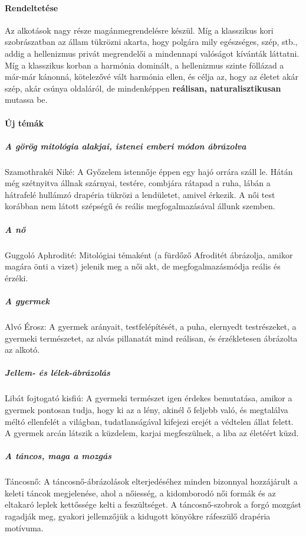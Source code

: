 \paragraph{Rendeltetése}
Az alkotások nagy része magánmegrendelésre készül. Míg a klasszikus kori szobrászatban az állam tükrözni akarta, hogy polgára mily egészséges, szép, stb., addig a hellenizmus privát megrendelői a mindennapi valóságot kívánták láttatni. Míg a klasszikus korban a harmónia dominált, a hellenizmus szinte föllázad a már-már kánonná, kötelezővé vált harmónia ellen, és célja az, hogy az életet akár szép, akár csúnya oldaláról, de mindenképpen \textbf{reálisan, naturalisztikusan} mutassa be.

\paragraph{Új témák}

	\subparagraph{A görög mitológia alakjai, istenei emberi módon ábrázolva}
	
	Szamothrakéi Niké: A Győzelem istennője éppen egy hajó orrára száll le. Hátán még szétnyitva állnak szárnyai, testére, combjára rátapad a ruha, lábán a hátrafelé hullámzó drapéria tükrözi a lendületet, amivel érkezik. A női test korábban nem látott szépségű és reális megfogalmazásával állunk szemben.
	
	\subparagraph{A nő}
	
	 Guggoló Aphrodité: Mitológiai témaként (a fürdőző Afroditét ábrázolja, amikor magára önti a vizet) jelenik meg a női akt, de megfogalmazásmódja reális és érzéki.
	
	\subparagraph{A gyermek}
	
	Alvó Érosz: A gyermek arányait, testfelépítését, a puha, elernyedt testrészeket, a gyermeki természetet, az alvás pillanatát mind reálisan, és érzékletesen ábrázolta az alkotó.
	
\clearpage	
	
	\subparagraph{Jellem- és lélek-ábrázolás}
	
	Libát fojtogató kisfiú: A gyermeki természet igen érdekes bemutatása, amikor a gyermek pontosan tudja, hogy ki az a lény, akinél ő feljebb való, és megtalálva méltó ellenfelét a világban, tudatlanságával kifejezi erejét a védtelen állat felett. A gyermek arcán látszik a küzdelem, karjai megfeszülnek, a liba az életéért küzd.
	
	\subparagraph{A táncos, maga a mozgás}
	
	Táncosnő: A táncosnő-ábrázolások elterjedéséhez minden bizonnyal hozzájárult a keleti táncok megjelenése, ahol a nőiesség, a kidomborodó női formák és az eltakaró leplek kettőssége kelti a feszültséget. A táncosnő-szobrok a forgó mozgást ragadják meg, gyakori jellemzőjük a kidugott könyökre ráfeszülő drapéria motívuma.
	
